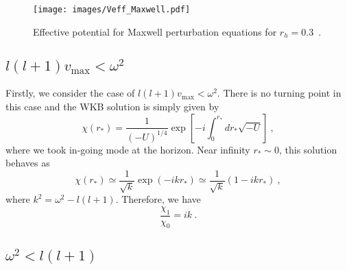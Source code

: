 \documentclass[a4paper,11pt]{article}
\begin{document}
    \begin{figure}
        \begin{center}
        \texttt{[image: images/Veff\_Maxwell.pdf]}
        \end{center}
        \caption{Effective potential for Maxwell perturbation equations for $r_h=0.3$\ .
        }
        \label{Veff}
    \end{figure}

\subsection{\texorpdfstring{$l(l+1) v_\textrm{max} <  \omega^2$}{Lg}}

    Firstly, we consider the case of $l(l+1) v_\textrm{max} < \omega^2$. There is no turning point in this case and the WKB solution is simply given by
    \begin{equation}
        \chi(r_\ast) = \frac{1}{(-U)^{1/4}} \exp\left[-i\int_0^{r_\ast} dr_\ast  \sqrt{-U}\right]\ ,
        \label{WKBa0}
    \end{equation}
    where we took in-going mode at the horizon. Near infinity $r_\ast\sim 0$, this solution behaves as
    \begin{equation}
        \chi(r_\ast)\simeq \frac{1}{\sqrt{k}} \exp(-ikr_\ast) \simeq \frac{1}{\sqrt{k}}(1-ikr_\ast)\ ,
    \end{equation}
    where $k^2=\omega^2-l(l+1)$. Therefore, we have
    \begin{equation}
        \frac{\chi_1}{\chi_0}=ik\ .
    \end{equation}

\subsection{\texorpdfstring{$\omega^2<l(l+1)$}{Lg}}
\end{document}
